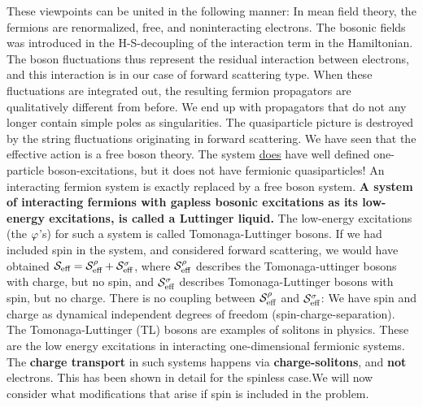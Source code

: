 These viewpoints can be united in the following manner:
In mean field theory, the fermions are renormalized, free, and noninteracting electrons. The bosonic fields was introduced in the H-S-decoupling of the interaction term in the Hamiltonian. The boson fluctuations thus represent the residual interaction between electrons, and this interaction is in our case of forward scattering type. When these fluctuations are integrated out, the resulting fermion propagators are qualitatively different from before. We end up with propagators that do not any longer contain simple poles as singularities. The quasiparticle picture is destroyed by the string fluctuations originating in forward scattering.
We have seen that the effective action is a free boson theory. The system \underline{does} have well defined one-particle boson-excitations, but it does not have fermionic quasiparticles! An interacting fermion system is exactly replaced by a free boson system. 
\textbf{A system of interacting fermions with gapless bosonic excitations as its low-energy excitations, is called a Luttinger liquid.}
The low-energy excitations (the $\varphi$'s) for such a system is called Tomonaga-Luttinger bosons. If we had included spin in the system, and considered forward scattering, we would have obtained \(\mathcal{S}_{\text{eff}} = \mathcal{S}_{\text{eff}}^\rho + \mathcal{S}_{\text{eff}}^\sigma\), where \(\mathcal{S}_{\text{eff}}^\rho\) describes the Tomonaga-uttinger bosons with charge, but no spin, and \(\mathcal{S}_{\text{eff}}^\sigma\) describes Tomonaga-Luttinger bosons with spin, but no charge. There is no coupling between \(\mathcal{S}_{\text{eff}}^\rho\) and \(\mathcal{S}_{\text{eff}}^\sigma\): We have spin and charge as dynamical independent degrees of freedom (spin-charge-separation)\cite{lee1988functional}.
The Tomonaga-Luttinger (TL) bosons are examples of solitons in physics. These are the low energy excitations in interacting one-dimensional fermionic systems. The \textbf{charge transport} in such systems happens via \textbf{charge-solitons}, and \textbf{not} electrons. This has been shown in detail for the spinless case.We will now consider what modifications that arise if spin is included in the problem.